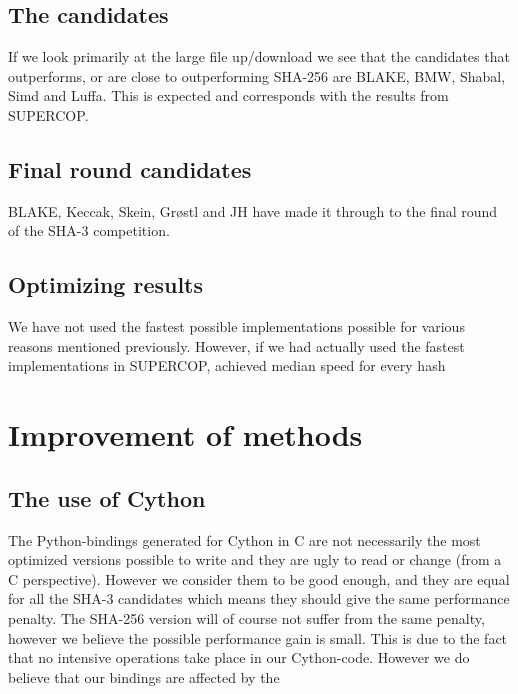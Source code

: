 \documentclass[english,12pt,a4paper]{book}
\begin{document}
\subsection{The candidates}
If we look primarily at the large file up/download we see that the candidates
that outperforms, or are close to outperforming \ac{SHA}-256 are BLAKE,
\ac{BMW}, Shabal, Simd and Luffa. This is expected and corresponds with the
results from \ac{SUPERCOP}.  

\subsection{Final round candidates}
BLAKE, Keccak, Skein, Grøstl and JH have made it through to the final round of
the \ac{SHA}-3 competition. %

\subsection{Optimizing results}
We have not used the fastest possible implementations possible for various
reasons mentioned previously. However, if we had actually used the fastest
implementations in \ac{SUPERCOP}, achieved median speed for every hash


%
%
%

\section{Improvement of methods}
%

\subsection{The use of Cython}

The Python-bindings generated for Cython in C are not necessarily the most
optimized versions possible to write and they are ugly to read or change (from
a C perspective). However we consider them to be good enough, and they are
equal for all the \ac{SHA}-3 candidates which means they should give the same
performance penalty. The \ac{SHA}-256 version will of course not suffer from
the same penalty, however we believe the possible performance gain is small.
This is due to the fact that no intensive operations take place in our
Cython-code. However we do believe that our bindings are affected by the 
\end{document}

